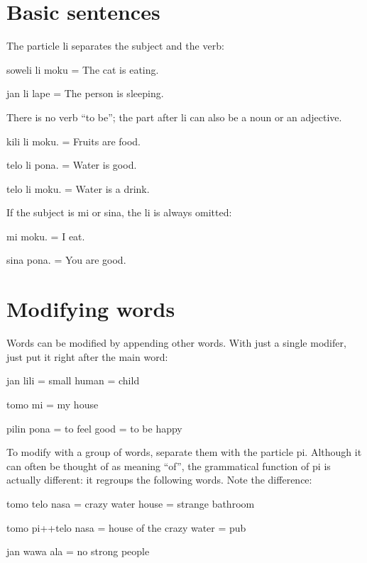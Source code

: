 \documentclass{article}
\newcommand\tp[1]{{\tpf #1}}
\begin{document}
\setlength{\parskip}{0.3em}
\begin{multicols}{2}
\raggedright

\section*{Basic sentences}
The particle \tp{li} separates the subject and the verb:
\begin{ex}
  \tp{soweli li moku} = The cat is eating.

  \tp{jan li lape} = The person is sleeping.
\end{ex}

There is no verb “to be”; the part after \tp{li} can also be
a noun or an adjective.
\begin{ex}
  \tp{kili li moku.} = Fruits are food.

  {\tpf telo li pona}. = Water is good.

  {\tpf telo li moku}. = Water is a drink.
\end{ex}

If the subject is {\tpf mi} or {\tpf sina}, the {\tpf li}
is always omitted:
\begin{ex}
  {\tpf mi moku}. = I eat.

  {\tpf sina pona}. = You are good.
\end{ex}

\section*{Modifying words }
Words can be modified by appending other words.  With just
a single modifer, just put it right after the main word:
\begin{ex}
  {\tpf jan lili} = small human = child

  {\tpf tomo mi} = my house

  {\tpf pilin pona} = to feel good = to be happy
\end{ex}

To modify with a group of words, separate them with
the particle {\tpf pi}. Although it can often be thought
of as meaning “of”, the grammatical function of {\tpf pi} is
actually different: it regroups the following words.
Note the difference:
\begin{ex}
  {\tpf tomo telo nasa} = crazy water house = strange bathroom

  {\tpf tomo pi++telo nasa} = house of the crazy water = pub

  {\tpf jan wawa ala} = no strong people


\end{ex}
\end{multicols}
\end{document}
